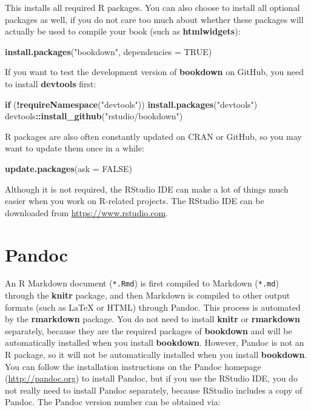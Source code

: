 \documentclass[
  12pt,
]{book}
\newenvironment{Shaded}{\begin{snugshade}}{\end{snugshade}}
\newcommand{\ControlFlowTok}[1]{\textcolor[rgb]{0.13,0.29,0.53}{\textbf{#1}}}
\newcommand{\DataTypeTok}[1]{\textcolor[rgb]{0.13,0.29,0.53}{#1}}
\newcommand{\KeywordTok}[1]{\textcolor[rgb]{0.13,0.29,0.53}{\textbf{#1}}}
\newcommand{\NormalTok}[1]{#1}
\newcommand{\OperatorTok}[1]{\textcolor[rgb]{0.81,0.36,0.00}{\textbf{#1}}}
\newcommand{\OtherTok}[1]{\textcolor[rgb]{0.56,0.35,0.01}{#1}}
\newcommand{\StringTok}[1]{\textcolor[rgb]{0.31,0.60,0.02}{#1}}
\begin{document}
This installs all required R packages. You can also choose to install all optional packages as well, if you do not care too much about whether these packages will actually be used to compile your book (such as \textbf{htmlwidgets}):

\begin{Shaded}
\begin{Highlighting}[]
\KeywordTok{install.packages}\NormalTok{(}\StringTok{"bookdown"}\NormalTok{, }\DataTypeTok{dependencies =} \OtherTok{TRUE}\NormalTok{)}
\end{Highlighting}
\end{Shaded}

If you want to test the development version of \textbf{bookdown} on GitHub, you need to install \textbf{devtools} first:

\begin{Shaded}
\begin{Highlighting}[]
\ControlFlowTok{if}\NormalTok{ (}\OperatorTok{!}\KeywordTok{requireNamespace}\NormalTok{(}\StringTok{"devtools"}\NormalTok{)) }\KeywordTok{install.packages}\NormalTok{(}\StringTok{"devtools"}\NormalTok{)}
\NormalTok{devtools}\OperatorTok{::}\KeywordTok{install\_github}\NormalTok{(}\StringTok{"rstudio/bookdown"}\NormalTok{)}
\end{Highlighting}
\end{Shaded}

R packages are also often constantly updated on CRAN or GitHub, so you may want to update them once in a while:

\begin{Shaded}
\begin{Highlighting}[]
\KeywordTok{update.packages}\NormalTok{(}\DataTypeTok{ask =} \OtherTok{FALSE}\NormalTok{)}
\end{Highlighting}
\end{Shaded}

Although it is not required, the RStudio IDE can make a lot of things much easier when you work on R-related projects. The RStudio IDE can be downloaded from \url{https://www.rstudio.com}.

\hypertarget{pandoc}{%
\section{Pandoc}\label{pandoc}}

An R Markdown document (\texttt{*.Rmd}) is first compiled to Markdown (\texttt{*.md}) through the \textbf{knitr} package, and then Markdown is compiled to other output formats (such as LaTeX or HTML) through Pandoc. This process is automated by the \textbf{rmarkdown} package. You do not need to install \textbf{knitr} or \textbf{rmarkdown} separately, because they are the required packages of \textbf{bookdown} and will be automatically installed when you install \textbf{bookdown}. However, Pandoc is not an R package, so it will not be automatically installed when you install \textbf{bookdown}. You can follow the installation instructions on the Pandoc homepage (\url{http://pandoc.org}) to install Pandoc, but if you use the RStudio IDE, you do not really need to install Pandoc separately, because RStudio includes a copy of Pandoc. The Pandoc version number can be obtained via:
\end{document}
